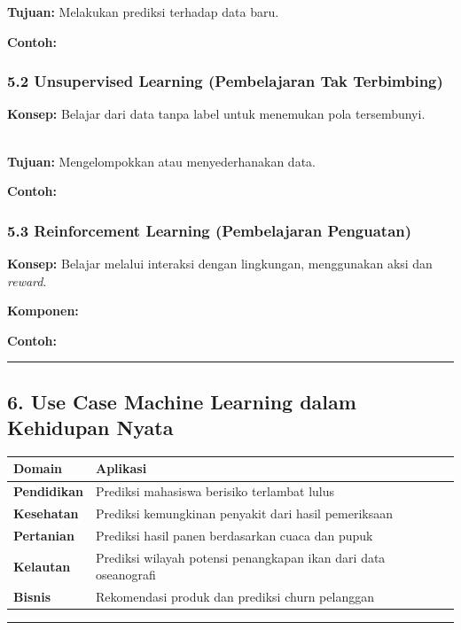 \documentclass[12pt,a4paper]{article}
\begin{document}
\textbf{Tujuan:} Melakukan prediksi terhadap data baru.


\textbf{Contoh:}


\subsubsection{5.2 Unsupervised Learning (Pembelajaran Tak Terbimbing)}

\textbf{Konsep:} Belajar dari data tanpa label untuk menemukan pola tersembunyi.


\\[
X \rightarrow \text{Model} \rightarrow \text{Pola / Cluster}
\\]


\textbf{Tujuan:} Mengelompokkan atau menyederhanakan data.


\textbf{Contoh:}


\subsubsection{5.3 Reinforcement Learning (Pembelajaran Penguatan)}

\textbf{Konsep:} Belajar melalui interaksi dengan lingkungan, menggunakan aksi dan \emph{reward}.


\textbf{Komponen:}


\textbf{Contoh:}


\hrule


\subsection{6. Use Case Machine Learning dalam Kehidupan Nyata}

\begin{tabular}{|l|l|}
\hline
Domain & Aplikasi \\
\hline
\textbf{Pendidikan} & Prediksi mahasiswa berisiko terlambat lulus \\
\hline
\textbf{Kesehatan} & Prediksi kemungkinan penyakit dari hasil pemeriksaan \\
\hline
\textbf{Pertanian} & Prediksi hasil panen berdasarkan cuaca dan pupuk \\
\hline
\textbf{Kelautan} & Prediksi wilayah potensi penangkapan ikan dari data oseanografi \\
\hline
\textbf{Bisnis} & Rekomendasi produk dan prediksi churn pelanggan \\
\hline
\end{tabular}


\hrule
\end{document}
